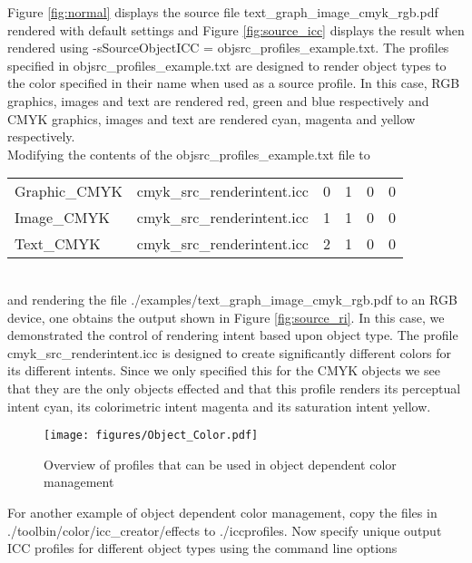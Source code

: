 \documentclass[12pt,notitlepage]{article}
\begin{document}
Figure \ref{fig:normal} displays the source file text\_graph\_image\_cmyk\_rgb.pdf rendered with default settings and Figure \ref{fig:source_icc} displays the result when rendered using  -sSourceObjectICC = objsrc\_profiles\_example.txt.   The profiles specified in objsrc\_profiles\_example.txt are designed to render object types to the color specified in their name when used as a source profile.  In this case, RGB graphics, images and text are rendered red, green and blue respectively and CMYK  graphics, images and text are rendered cyan, magenta and yellow respectively.\\

Modifying the contents of the objsrc\_profiles\_example.txt file to\\

\begin{tabular}{llllll}
Graphic\_CMYK & cmyk\_src\_renderintent.icc	& 0 & 1 & 0 & 0\\
Image\_CMYK	& cmyk\_src\_renderintent.icc	& 1 & 1 & 0 & 0 \\
Text\_CMYK	& cmyk\_src\_renderintent.icc	& 2 & 1 & 0 & 0 \\
\end{tabular}\\

\noindent and rendering the file ./examples/text\_graph\_image\_cmyk\_rgb.pdf to an RGB device, one obtains the output shown in Figure \ref{fig:source_ri}.  In this case, we demonstrated the control of rendering intent based upon object type.  The profile cmyk\_src\_renderintent.icc is designed to create significantly different colors for its different intents. Since we only specified this for the CMYK objects we see that they are the only objects effected and that this profile renders its perceptual intent cyan, its colorimetric intent magenta and its saturation intent yellow.

\begin{figure}
    \begin{center}
\texttt{[image: figures/Object\_Color.pdf]}
    \end{center}
   \caption{Overview of profiles that can be used in object dependent color
            management}
\label{fig:object_dep_color}
\end{figure}

For another example of object dependent color management, copy the files in\\
./toolbin/color/icc\_creator/effects to ./iccprofiles.  Now specify unique output ICC profiles for different object types using the command line options\\
\end{document}
